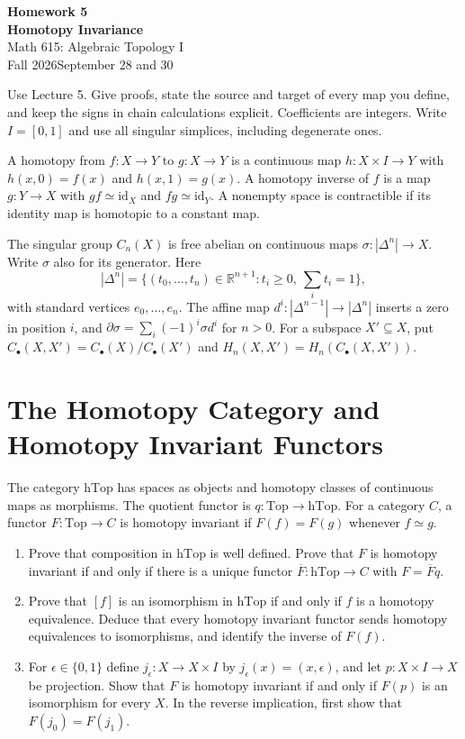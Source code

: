 \documentclass[11pt]{article}
\newcommand{\coursetitle}[3]{\begin{center}{\large\bfseries\color{teal}#1}\\[4pt]{\LARGE\bfseries\color{teal}#2}\\[6pt]Math 615: Algebraic Topology I\\Fall 2026\quad\textbar\quad #3\end{center}}
\begin{document}
\coursetitle{Homework 5}{Homotopy Invariance}{September 28 and 30}
Use Lecture 5. Give proofs, state the source and target of every map you define, and keep the signs in chain calculations explicit. Coefficients are integers. Write $I=[0,1]$ and use all singular simplices, including degenerate ones.

A homotopy from $f:X\to Y$ to $g:X\to Y$ is a continuous map $h:X\times I\to Y$ with $h(x,0)=f(x)$ and $h(x,1)=g(x)$. A homotopy inverse of $f$ is a map $g:Y\to X$ with $gf\simeq\mathrm{id}_X$ and $fg\simeq\mathrm{id}_Y$. A nonempty space is contractible if its identity map is homotopic to a constant map.

The singular group $C_n(X)$ is free abelian on continuous maps $\sigma:|\Delta^n|\to X$. Write $\sigma$ also for its generator. Here
\[
|\Delta^n|=\{(t_0,\ldots,t_n)\in\mathbb R^{n+1}:t_i\geq0,\ \textstyle\sum_i t_i=1\},
\]
with standard vertices $e_0,\ldots,e_n$. The affine map $d^i:|\Delta^{n-1}|\to|\Delta^n|$ inserts a zero in position $i$, and $\partial\sigma=\sum_i(-1)^i\sigma d^i$ for $n>0$. For a subspace $X'\subseteq X$, put $C_\bullet(X,X')=C_\bullet(X)/C_\bullet(X')$ and $H_n(X,X')=H_n(C_\bullet(X,X'))$.

\section{The Homotopy Category and Homotopy Invariant Functors}
The category $\mathrm{hTop}$ has spaces as objects and homotopy classes of continuous maps as morphisms. The quotient functor is $q:\mathrm{Top}\to\mathrm{hTop}$. For a category $C$, a functor $F:\mathrm{Top}\to C$ is homotopy invariant if $F(f)=F(g)$ whenever $f\simeq g$.
\begin{enumerate}
\item Prove that composition in $\mathrm{hTop}$ is well defined. Prove that $F$ is homotopy invariant if and only if there is a unique functor $\overline F:\mathrm{hTop}\to C$ with $F=\overline Fq$.
\item Prove that $[f]$ is an isomorphism in $\mathrm{hTop}$ if and only if $f$ is a homotopy equivalence. Deduce that every homotopy invariant functor sends homotopy equivalences to isomorphisms, and identify the inverse of $F(f)$.
\item For $\epsilon\in\{0,1\}$ define $j_\epsilon:X\to X\times I$ by $j_\epsilon(x)=(x,\epsilon)$, and let $p:X\times I\to X$ be projection. Show that $F$ is homotopy invariant if and only if $F(p)$ is an isomorphism for every $X$. In the reverse implication, first show that $F(j_0)=F(j_1)$.
\end{enumerate}
\end{document}
